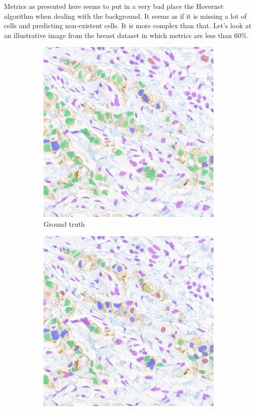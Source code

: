 Metrics as presented here seems to put in a very bad place the Hovernet algorithm when dealing with the background. It seems as if it is missing a lot of cells and predicting non-existent cells. It is more complex than that. Let's look at an illustrative image from the breast dataset in which metrics are less than $60\%$. 

\begin{figure}[H]
    \centering
    \begin{subfigure}{0.45\textwidth}
      \centering
      \includegraphics[width=\textwidth]{imgs/scaling/GT_pre.png}
      \caption{Ground truth}
    \end{subfigure}
    \hfill
    \begin{subfigure}{0.45\textwidth}
      \centering
      \includegraphics[width=\textwidth]{imgs/scaling/pred_pre.png}

\end{subfigure}
\end{figure}

